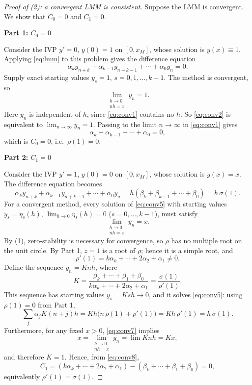\documentclass[11pt,a4paper]{article}
\numberwithin{equation}{section}
\theoremstyle{spacedplain}
\theoremstyle{spaceddefinition}
\theoremstyle{spacedremark}
\newcommand{\step}[1]{\par\addvspace{0.6em}\noindent\textbf{#1}\par\nobreak}
\begin{document}
\begin{proof}[Proof of \textup{(2)}: a convergent LMM is consistent]
Suppose the LMM is convergent.  We show that \(C_0=0\) and \(C_1=0\).

\step{Part 1: \(C_0=0\)}
Consider the IVP \(y'=0\), \(y(0)=1\) on
\([0,x_M]\), whose solution is \(y(x)\equiv1\).  Applying
\eqref{eq:lmm} to this problem gives the difference equation
\begin{equation}\label{eq:conv1}
  \alpha_ky_{n+k}+\alpha_{k-1}y_{n+k-1}+\cdots+\alpha_0y_n=0.
\end{equation}
Supply exact starting values \(y_s=1\), \(s=0,1,\dots,k-1\).  The method
is convergent, so
\begin{equation}\label{eq:conv2}
  \lim_{\substack{h\to0\\nh=x}}y_n=1.
\end{equation}
Here \(y_n\) is independent of \(h\), since \eqref{eq:conv1} contains
no \(h\).  So \eqref{eq:conv2} is equivalent to
\(\lim_{n\to\infty}y_n=1\).  Passing to the limit \(n\to\infty\) in
\eqref{eq:conv1} gives
\[
  \alpha_k+\alpha_{k-1}+\cdots+\alpha_0=0,
\]
which is \(C_0=0\), i.e.\ \(\rho(1)=0\).

\step{Part 2: \(C_1=0\)}
Consider the IVP \(y'=1\), \(y(0)=0\) on
\([0,x_M]\), whose solution is \(y(x)=x\).  The difference equation
becomes
\begin{equation}\label{eq:conv5}
  \alpha_ky_{n+k}+\alpha_{k-1}y_{n+k-1}+\cdots+\alpha_0y_n
  =h(\beta_k+\beta_{k-1}+\cdots+\beta_0)=h\,\sigma(1).
\end{equation}
For a convergent method, every solution of \eqref{eq:conv5} with
starting values \(y_s=\eta_s(h)\), \(\lim_{h\to0}\eta_s(h)=0\)
(\(s=0,\dots,k-1\)), must satisfy
\begin{equation}\label{eq:conv7}
  \lim_{\substack{h\to0\\nh=x}}y_n=x.
\end{equation}
By (1), zero-stability is necessary for convergence, so \(\rho\) has
no multiple root on the unit circle.  By Part 1, \(z=1\) is a root of
\(\rho\); hence it is a simple root, and
\[
  \rho'(1)=k\alpha_k+\cdots+2\alpha_2+\alpha_1\ne0.
\]
Define the sequence \(y_n=Knh\), where
\begin{equation}\label{eq:conv8}
  K=\frac{\beta_k+\cdots+\beta_1+\beta_0}
         {k\alpha_k+\cdots+2\alpha_2+\alpha_1}
   =\frac{\sigma(1)}{\rho'(1)}.
\end{equation}
This sequence has starting values \(y_s=Ksh\to0\), and it solves
\eqref{eq:conv5}: using \(\rho(1)=0\) from Part 1,
\[
  \sum_j\alpha_jK(n+j)h
  =Kh\bigl(n\,\rho(1)+\rho'(1)\bigr)
  =Kh\,\rho'(1)
  =h\,\sigma(1).
\]
Furthermore, for any fixed \(x>0\), \eqref{eq:conv7} implies
\[
  x=\lim_{\substack{h\to0\\nh=x}}y_n=\lim Knh=Kx,
\]
and therefore \(K=1\).  Hence, from \eqref{eq:conv8},
\[
  C_1=(k\alpha_k+\cdots+2\alpha_2+\alpha_1)
      -(\beta_k+\cdots+\beta_1+\beta_0)=0,
\]
equivalently \(\rho'(1)=\sigma(1)\).
\end{proof}
\end{document}
